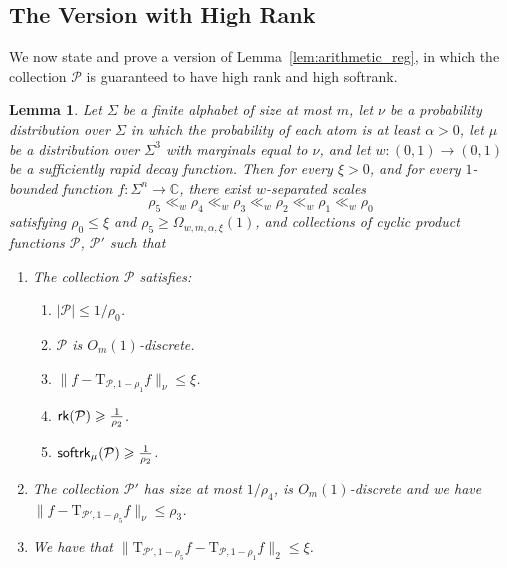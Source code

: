 \documentclass[11pt]{article}
\newtheorem{lemma}[thm]{Lemma}
\newcommand\card[1]{\left| {#1} \right|}
\newcommand\norm[1]{\| #1 \|}
\newcommand\eps{\varepsilon}
\renewcommand\geq{\geqslant}
\renewcommand\leq{\leqslant}
\begin{document}
\subsection{The Version with High Rank}
We now state and prove a version of Lemma~\ref{lem:arithmetic_reg}, in which the collection $\mathcal{P}$ is guaranteed to have high rank and high softrank. 
\begin{lemma}\label{lem:arithmetic_reg_high_rank}
    Let $\Sigma$ be a finite alphabet of size at most $m$, let $\nu$ be a probability distribution over $\Sigma$ in which the probability of each atom is at least $\alpha>0$, 
    let $\mu$ be a distribution over $\Sigma^3$ with marginals equal to $\nu$, and let $w\colon (0,1)\to(0,1)$ be a sufficiently rapid decay function. Then for every $\xi>0$, and for every $1$-bounded function $f:\Sigma^n\to\mathbb{C}$, there exist $w$-separated scales
    \[
    \rho_5\ll_{w}\rho_4\ll_w\rho_3\ll_w\rho_2\ll_w\rho_1\ll_w\rho_0
\]
satisfying $\rho_0\leq \xi$ and $\rho_5\geq \Omega_{w,m,\alpha,\xi}(1)$, and collections of cyclic product functions $\mathcal{P}$, $\mathcal{P}'$ such that


    
    \begin{enumerate}
        \item The collection $\mathcal{P}$ satisfies:
        \begin{enumerate}
            \item $\card{\mathcal{P}}\leq 1/\rho_0$.
            \item $\mathcal{P}$ is $O_{m}(1)$-discrete.
            \item $\norm{f-\mathrm{T}_{\mathcal{P},1-\rho_{1}}f}_{\nu}\leq \xi$.
            \item ${\sf rk}(\mathcal{P})\geq \frac{1}{\rho_{2}}$.
            \item ${\sf softrk}_{\mu}(\mathcal{P})\geq \frac{1}{\rho_{2}}$.
        \end{enumerate}
        \item The collection $\mathcal{P}'$ has size at most $1/\rho_{4}$, is $O_{m}(1)$-discrete and we have $\norm{f-\mathrm{T}_{\mathcal{P}',1-\rho_{5}}f}_{\nu}\leq \rho_{3}$.
        \item We have that 
        $\norm{\mathrm{T}_{\mathcal{P}',1-\rho_{5}}f -\mathrm{T}_{\mathcal{P},1-\rho_{1}} f}_2\leq \xi$.
    \end{enumerate}
\end{lemma}
\end{document}
